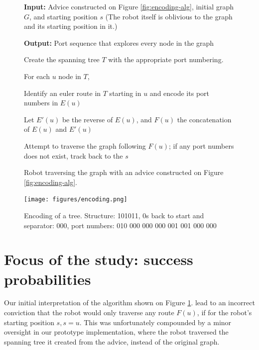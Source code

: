 \documentclass{article}
\begin{document}
\begin{figure}
  \textbf{Input:} Advice constructed on Figure \ref{fig:encoding-alg}, initial graph $G$, and starting position $s$ (The robot itself is oblivious to the graph and its starting position in it.)

  \textbf{Output:} Port sequence that explores every node in the graph
  \vspace{1em}

  \begin{compactenum}
  \item Create the spanning tree $T$ with the appropriate port numbering.
  \item \label{for-loop}For each $u$ node in $T$,    
    \begin{compactenum}
      \item Identify an euler route in $T$ starting in $u$ and encode its port numbers in $E(u)$
      \item Let $E'(u)$ be the reverse of $E(u)$, and $F(u)$ the concatenation of $E(u)$ and $E'(u)$
      \item Attempt to traverse the graph following $F(u)$; if any port numbers does not exist, track back to the $s$
    \end{compactenum}
  \end{compactenum}
  \caption{Robot traversing the graph with an advice constructed on Figure \ref{fig:encoding-alg}.}
  \label{fig:map-robot-exploration}
\end{figure}

\begin{figure}
  \centering
  \texttt{[image: figures/encoding.png]}
  \caption{Encoding of a tree. Structure: 101011, 0s back to start and separator: 000, port numbers: 010 000 000 000 001 001 000 000}
  \label{fig:encoding}
\end{figure}

\section{Focus of the study: success probabilities}
\label{sec:focus}

Our initial interpretation of the algorithm shown on Figure \ref{fig:map-robot-exploration}. lead to an incorrect conviction that the robot would only traverse any route $F(u)$, if for the robot's starting position $s, s=u$. This was unfortunately compounded by a minor oversight in our prototype implementation, where the robot traversed the spanning tree it created from the advice, instead of the original graph.
\end{document}
